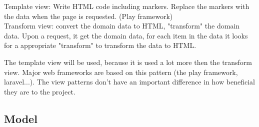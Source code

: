 Template view: Write HTML code including markers. Replace the markers with the data when the page is requested. (Play framework)\\
Transform view: convert the domain data to HTML, "transform" the domain data. Upon a request, it get the domain data, for each item in the data it looks for a appropriate "transform" to transform the data to HTML.

The template view will be used, because it is used a lot more then the transform view. Major web frameworks are based on this pattern (the play framework, laravel...). The view patterns don't have an important difference in how beneficial they are to the project.


\subsection{Model}
